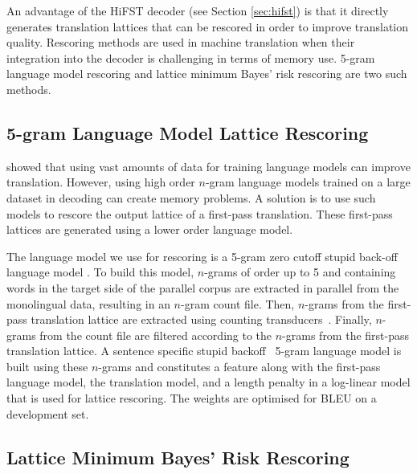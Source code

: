 An advantage of the HiFST decoder (see Section \ref{sec:hifst}) is that it directly %
generates translation lattices that can be rescored in order to improve translation quality.
Rescoring methods are used in machine translation when their integration into the decoder
is challenging in terms of memory use. 5-gram language model rescoring and lattice minimum
Bayes' risk rescoring are two such methods.

\subsection{5-gram Language Model Lattice Rescoring}
\label{sec:background5gRescoring}

\citet{brants-popat-xu-och-dean:2007:EMNLP-CoNLL} showed that using vast
amounts of data for training language models can improve translation. However,
using high order $n$-gram language models trained on
a large dataset in decoding can create memory problems. %
A solution is to use such models to rescore the output
lattice of a first-pass translation. These first-pass lattices are generated
using a lower
order language model.

The language model we use for rescoring is a 5-gram zero cutoff stupid back-off language model \cite{brants-popat-xu-och-dean:2007:EMNLP-CoNLL}.
To build this model, $n$-grams of order up to 5 and containing words in the target side of the parallel corpus 
are extracted in parallel from the monolingual data, resulting in an $n$-gram count file.
Then, $n$-grams from the first-pass translation lattice 
are extracted using counting transducers~\citep{allauzen:03}.
Finally, $n$-grams from the count file are filtered according to the $n$-grams from the first-pass 
translation lattice. A sentence specific stupid backoff~\citep{brants-popat-xu-och-dean:2007:EMNLP-CoNLL}
5-gram language model is built using these $n$-grams and constitutes a feature along with the first-pass
language model, the translation model, and a length penalty in a log-linear model that is used
for lattice rescoring. The weights are optimised for BLEU on a development set.

\subsection{Lattice Minimum Bayes' Risk Rescoring} \label{sec:lmbr}


